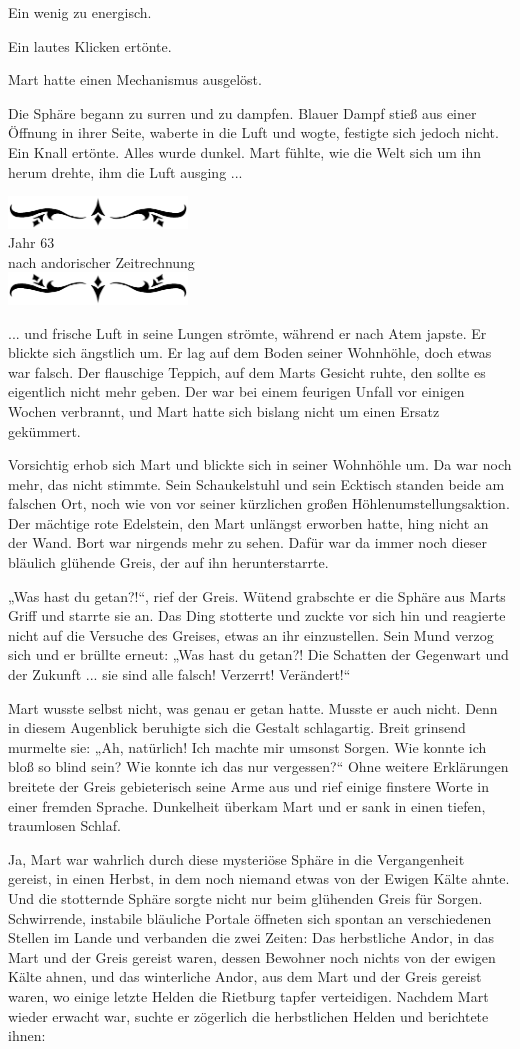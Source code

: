 \documentclass[10pt, a4paper, oneside]{book}
\newcommand{\az}[1]{%
    \begin{center}
        \includegraphics[width=180px]{Das Erbe des Wunderkindes/verzierung1.png}\\
        {\Huge #1} \\
        {nach andorischer Zeitrechnung}\\
        \includegraphics[width=180px]{Das Erbe des Wunderkindes/verzierung2.png}
    \end{center}
    \extramarks{}{#1 a.Z.}
}
\begin{document}
Ein wenig zu energisch. 

Ein lautes Klicken ertönte.

Mart hatte einen Mechanismus ausgelöst.

Die Sphäre begann zu surren und zu dampfen. Blauer Dampf stieß aus einer Öffnung in ihrer Seite, waberte in die Luft und wogte, festigte sich jedoch nicht. Ein Knall ertönte. Alles wurde dunkel. Mart fühlte, wie die Welt sich um ihn herum drehte, ihm die Luft ausging ... \bigskip

\az{Jahr 63}

... und frische Luft in seine Lungen strömte, während er nach Atem japste. Er blickte sich ängstlich um. Er lag auf dem Boden seiner Wohnhöhle, doch etwas war falsch. Der flauschige Teppich, auf dem Marts Gesicht ruhte, den sollte es eigentlich nicht mehr geben. Der war bei einem feurigen Unfall vor einigen Wochen verbrannt, und Mart hatte sich bislang nicht um einen Ersatz gekümmert. 

Vorsichtig erhob sich Mart und blickte sich in seiner Wohnhöhle um. Da war noch mehr, das nicht stimmte. Sein Schaukelstuhl und sein Ecktisch standen beide am falschen Ort, noch wie von vor seiner kürzlichen großen Höhlenumstellungsaktion. Der mächtige rote Edelstein, den Mart unlängst erworben hatte, hing nicht an der Wand. Bort war nirgends mehr zu sehen. Dafür war da immer noch dieser bläulich glühende Greis, der auf ihn herunterstarrte.

„Was hast du getan?!“, rief der Greis. Wütend grabschte er die Sphäre aus Marts Griff und starrte sie an. Das Ding stotterte und zuckte vor sich hin und reagierte nicht auf die Versuche des Greises, etwas an ihr einzustellen. Sein Mund verzog sich und er brüllte erneut: „Was hast du getan?! Die Schatten der Gegenwart und der Zukunft ... sie sind alle falsch! Verzerrt! Verändert!“

Mart wusste selbst nicht, was genau er getan hatte. Musste er auch nicht. Denn in diesem Augenblick beruhigte sich die Gestalt schlagartig. Breit grinsend murmelte sie: „Ah, natürlich! Ich machte mir umsonst Sorgen. Wie konnte ich bloß so blind sein? Wie konnte ich das nur vergessen?“ Ohne weitere Erklärungen breitete der Greis gebieterisch seine Arme aus und rief einige finstere Worte in einer fremden Sprache. Dunkelheit überkam Mart und er sank in einen tiefen, traumlosen Schlaf. \bigskip

Ja, Mart war wahrlich durch diese mysteriöse Sphäre in die Vergangenheit gereist, in einen Herbst, in dem noch niemand etwas von der Ewigen Kälte ahnte. Und die stotternde Sphäre sorgte nicht nur beim glühenden Greis für Sorgen. Schwirrende, instabile bläuliche Portale öffneten sich spontan an verschiedenen Stellen im Lande und verbanden die zwei Zeiten: Das herbstliche Andor, in das Mart und der Greis gereist waren, dessen Bewohner noch nichts von der ewigen Kälte ahnen, und das winterliche Andor, aus dem Mart und der Greis gereist waren, wo einige letzte Helden die Rietburg tapfer verteidigen. Nachdem Mart wieder erwacht war, suchte er zögerlich die herbstlichen Helden und berichtete ihnen: 
\end{document}
